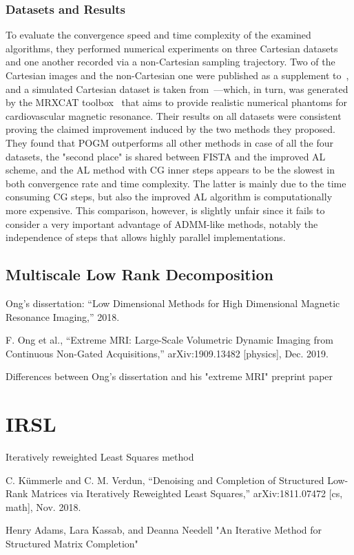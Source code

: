 \subsubsection{Datasets and Results}
To evaluate the convergence speed and time complexity of the examined algorithms, they performed numerical experiments on three Cartesian datasets and one another recorded via a non-Cartesian sampling trajectory. Two of the Cartesian images and the non-Cartesian one were published as a supplement to~\cite{otazo_lowrank_2015}, and a simulated Cartesian dataset is taken from~\cite{nakarmi_accelerating_2016}---which, in turn, was generated by the MRXCAT toolbox~\cite{wissmann_mrxcat_2014} that aims to provide realistic numerical phantoms for cardiovascular magnetic resonance. Their results on all datasets were consistent proving the claimed improvement induced by the two methods they proposed. They found that POGM outperforms all other methods in case of all the four datasets, the "second place" is shared between FISTA and the improved AL scheme, and the AL method with CG inner steps appears to be the slowest in both convergence rate and time complexity. The latter is mainly due to the time consuming CG steps, but also the improved AL algorithm is computationally more expensive. This comparison, however, is slightly unfair since it fails to consider a very important advantage of ADMM-like methods, notably the independence of steps that allows highly parallel implementations.

\subsection{Multiscale Low Rank Decomposition}

Ong's dissertation: “Low Dimensional Methods for High Dimensional Magnetic Resonance Imaging,” 2018.

F. Ong et al., “Extreme MRI: Large-Scale Volumetric Dynamic Imaging from Continuous Non-Gated Acquisitions,” arXiv:1909.13482 [physics], Dec. 2019.

Differences between Ong's dissertation and his "extreme MRI" preprint paper

\section{IRSL}
Iteratively reweighted Least Squares method

C. Kümmerle and C. M. Verdun, “Denoising and Completion of Structured Low-Rank Matrices via Iteratively Reweighted Least Squares,” arXiv:1811.07472 [cs, math], Nov. 2018.

Henry Adams, Lara Kassab, and Deanna Needell "An Iterative Method for Structured Matrix Completion"

\clearpage %